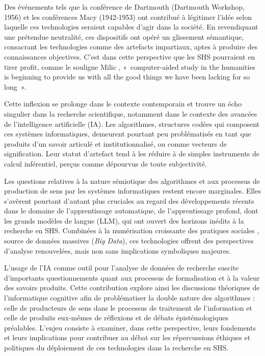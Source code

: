 \documentclass[fra, final]{anthology-ch}
\begin{document}
Des événements tels que la conférence de Dartmouth (Dartmouth Workshop, 1956) et les conférences Macy (1942-1953) ont contribué à légitimer l’idée selon laquelle ces technologies seraient capables d’agir dans la société. En revendiquant une prétendue neutralité, ces dispositifs ont opéré un glissement sémantique, consacrant les technologies comme des artefacts impartiaux, aptes à produire des connaissances objectives. C’est dans cette perspective que les SHS pourraient en tirer profit, comme le souligne Milic \cite{milic1966}, «~computer-aided study in the humanities is beginning to provide us with all the good things we have been lacking for so long~».

Cette inflexion se prolonge dans le contexte contemporain et trouve un écho singulier dans la recherche scientifique, notamment dans le contexte des avancées de l'intelligence artificielle (IA). Les algorithmes, structures codées qui composent ces systèmes informatiques, demeurent pourtant peu problématisés en tant que produits d'un savoir articulé et institutionnalisé, ou comme vecteurs de signification. Leur statut d’artefact tend à les réduire à de simples instruments de calcul inférentiel, perçus comme dépourvus de toute subjectivité.

Les questions relatives à la nature sémiotique des algorithmes et aux processus de production de sens par les systèmes informatiques restent encore marginales. Elles s'avèrent pourtant d'autant plus cruciales au regard des développements récents dans le domaine de l'apprentissage automatique, de l’apprentissage profond, dont les grands modèles de langue (LLM), qui ont ouvert des horizons inédits à la recherche en SHS. Combinées à la numérisation croissante des pratiques sociales \cite{bonenfant2020, kraynak2020}, source de données massives (\textit{Big Data}), ces technologies offrent des perspectives d’analyse renouvelées, mais non sans implications symboliques majeures. 

L’usage de l’IA comme outil pour l'analyse de données de recherche suscite d'importants questionnements quant aux processus de formalisation et à la valeur des savoirs produits. Cette contribution explore ainsi les discussions théoriques de l'informatique cognitive afin de problématiser la double nature des algorithmes : celle de producteurs de sens dans le processus de traitement de l’information et celle de produits eux-mêmes de réflexions et de débats épistémologiques préalables. L'enjeu consiste à examiner, dans cette perspective, leurs fondements et leurs implications pour contribuer au débat sur les répercussions éthiques et politiques du déploiement de ces technologies dans la recherche en SHS.
\end{document}
